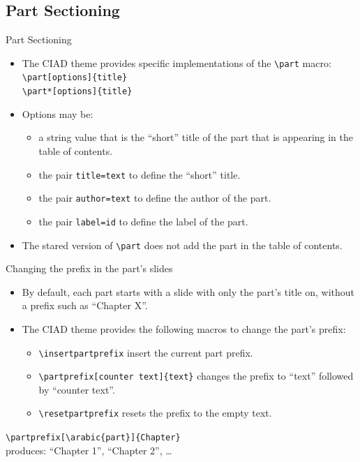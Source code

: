 \documentclass[english,sectioncirclenumberstyle]{ciadbeamer}
\begin{document}
\subsection{Part Sectioning}

\begin{frame}{Part Sectioning}
	\begin{itemize}
	\item The CIAD theme provides specific implementations of the \texttt{{\textbackslash}part} macro: \\
		\texttt{{\textbackslash}part[options]\{title\}} \\
		\texttt{{\textbackslash}part*[options]\{title\}}
	\vfill
	\item Options may be: \begin{itemize}
		\item a string value that is the ``short'' title of the part that is appearing in the table of contents.
		\item the pair \texttt{title=text} to define the ``short'' title.
		\item the pair \texttt{author=text} to define the author of the part.
		\item the pair \texttt{label=id} to define the label of the part.
		\end{itemize}
	\vfill
	\item The stared version of \texttt{{\textbackslash}part} does not add the part in the table of contents.
	\end{itemize}
\end{frame}

\begin{frame}{Changing the prefix in the part's slides}
	\begin{itemize}
	\item By default, each part starts with a slide with only the part's title on, without a prefix such as ``Chapter X''.
	\vfill
	\item The CIAD theme provides the following macros to change the part's prefix:
		\begin{itemize}
		\item \texttt{{\textbackslash}insertpartprefix} insert the current part prefix.
		\item \texttt{{\textbackslash}partprefix[counter text]\{text\}} changes the prefix to ``text'' followed by ``counter text''.
		\item \texttt{{\textbackslash}resetpartprefix} resets the prefix to the empty text.
		\end{itemize}
	\end{itemize}
	\vfill
	\begin{example}
		\texttt{{\textbackslash}partprefix[{\textbackslash}arabic\{part\}]\{Chapter\}} \\
		produces: ``Chapter 1'', ``Chapter 2'', \dots
	\end{example}
\end{frame}
\end{document}
